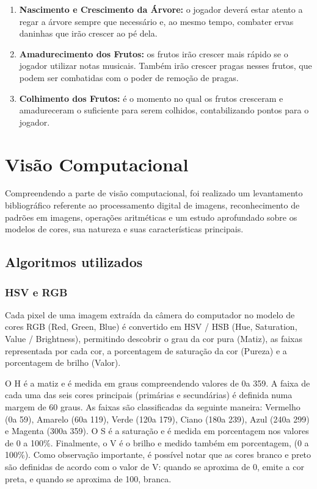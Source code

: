 \documentclass[12pt]{article}
\begin{document}
\begin{enumerate}
\item \textbf{Nascimento e Crescimento da \'Arvore:} o jogador dever\'a estar atento a regar a \'arvore sempre que
necess\'ario e, ao mesmo tempo, combater ervas daninhas que ir\~ao crescer ao p\'e dela.
\item \textbf{Amadurecimento dos Frutos:} os frutos ir\~ao crescer mais r\'apido se o jogador utilizar notas musicais.
Tamb\'em ir\~ao crescer pragas nesses frutos, que podem ser combatidas com o poder de remo\c c\~ao de pragas.
\item \textbf{Colhimento dos Frutos:} \'e o momento no qual os frutos cresceram e amadureceram
 o suficiente para serem colhidos, contabilizando pontos para o jogador.
\end{enumerate}

\section{Vis\~ao Computacional}

Compreendendo a parte de vis\~ao computacional, foi realizado um levantamento bibliogr\'afico
referente ao processamento digital de imagens, reconhecimento de padr\~oes em imagens, opera\c c\~oes
aritm\'eticas e um estudo aprofundado sobre os modelos de cores, sua natureza e suas caracter\'isticas principais.

\subsection{Algoritmos utilizados\label{sec:alg}}
\subsubsection{HSV e RGB}
Cada pixel de uma imagem extra\'ida da c\^amera do computador no modelo de cores RGB (Red, Green, Blue) \'e convertido em
HSV / HSB (Hue, Saturation, Value / Brightness), permitindo descobrir o grau da cor pura (Matiz), as faixas representada por cada cor,
a porcentagem de satura\c c\~ao da cor (Pureza) e a porcentagem de brilho (Valor).

O H \'e a matiz e \'e medida em graus compreendendo valores de 0\degree a 359\degree.
A faixa de cada uma das seis cores principais (prim\'arias e secund\'arias) \'e definida numa margem de 60 graus.
As faixas s\~ao classificadas da seguinte maneira: Vermelho (0\degree a 59\degree), Amarelo (60\degree a 119\degree), Verde (120\degree a 179\degree),
Ciano (180\degree a 239\degree), Azul (240\degree a 299\degree) e Magenta (300\degree a 359\degree).
O S \'e a satura\c c\~ao e \'e medida em porcentagem nos valores de 0 a 100\%.
Finalmente, o V \'e o brilho e medido tamb\'em em porcentagem, (0 a 100\%). Como observa\c c\~ao importante, \'e possível notar
que as cores branco e preto s\~ao definidas de acordo com o valor de V: quando se aproxima de 0, emite a cor preta,
e quando se aproxima de 100, branca.
\end{document}
